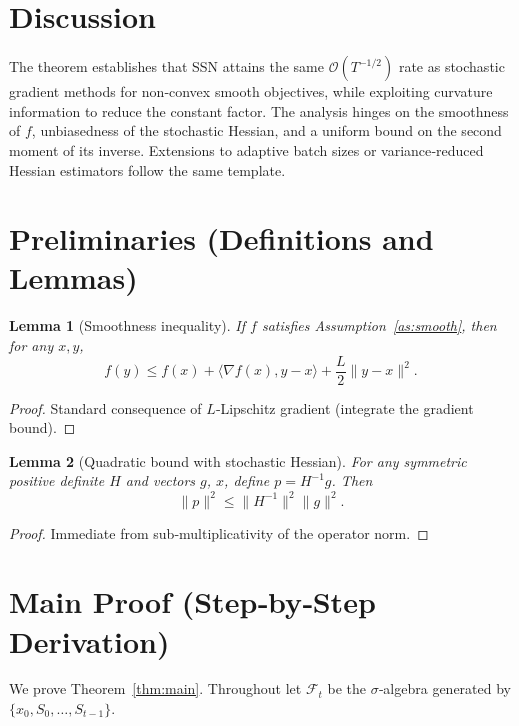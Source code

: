 \documentclass{article}
\newtheorem{lemma}{Lemma}
\newcommand{\ip}[2]{\langle #1,#2\rangle}
\begin{document}
\section*{Discussion}
The theorem establishes that SSN attains the same $\mathcal{O}(T^{-1/2})$ rate as stochastic gradient methods for non‑convex smooth objectives, while exploiting curvature information to reduce the constant factor. The analysis hinges on the smoothness of $f$, unbiasedness of the stochastic Hessian, and a uniform bound on the second moment of its inverse. Extensions to adaptive batch sizes or variance‑reduced Hessian estimators follow the same template.

\newpage
\section*{Preliminaries (Definitions and Lemmas)}
\begin{lemma}[Smoothness inequality]\label{lem:smooth}
If $f$ satisfies Assumption~\ref{as:smooth}, then for any $x,y$,
\[
f(y)\le f(x)+\ip{\nabla f(x)}{y-x}+\frac{L}{2}\|y-x\|^2.
\tag{2}
\]
\end{lemma}
\begin{proof}
Standard consequence of $L$‑Lipschitz gradient (integrate the gradient bound). \end{proof}

\begin{lemma}[Quadratic bound with stochastic Hessian]\label{lem:hess}
For any symmetric positive definite $H$ and vectors $g$, $x$, define $p=H^{-1}g$. Then
\[
\|p\|^2\le \|H^{-1}\|^2\|g\|^2.
\tag{3}
\]
\end{lemma}
\begin{proof}
Immediate from sub‑multiplicativity of the operator norm. \end{proof}

\section*{Main Proof (Step‑by‑Step Derivation)}
We prove Theorem~\ref{thm:main}. Throughout let $\mathcal{F}_t$ be the $\sigma$‑algebra generated by $\{x_0,S_0,\dots,S_{t-1}\}$.
\end{document}

